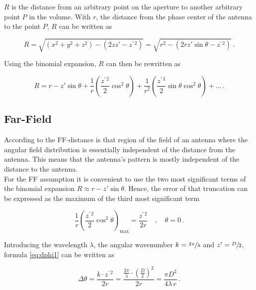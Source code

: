 $R$ is the distance from an arbitrary point on the aperture to another arbitrary point $P$ in the volume. With $r$, the distance from the phase center of the antenna to the point $P$, $R$ can be written as \cite{balanis}

\begin{equation}
R = \sqrt{\left(x^2+y^2+z^2\right)-\left(2zz'-z^{\prime\, 2}\right)}=\sqrt{r^2-\left(2rz'\sin \theta -z^{\prime\, 2}\right)}\,.
\end{equation}

Using the binomial expansion, $R$ can then be rewritten as

\begin{equation}
R = r - z'\sin\theta + \frac{1}{r}\left(\frac{z^{\prime\, 2}}{2}\cos ^2 \theta\right) + \frac{1}{r^2}\left(\frac{z^{\prime\, 3}}{2}\sin\theta\cos^2\theta\right) + \dots\,.
\end{equation}

\subsection{Far-Field}

According to \cite{balanis} the \ac{FF}-distance is \glqq that region of the field of an antenna where the angular field distribution is essentially independent of the distance from the antenna.\grqq{ }
This means that the antenna's pattern is mostly independent of the distance to the antenna.\\
For the \ac{FF} assumption it is convenient to use the two most significant terms of the binomial expansion $R\approx r - z'\sin\theta$. Hence, the error of that truncation can be expressed as the maximum of the third most significant term

\begin{equation}
\frac{1}{r}\left(\frac{z^{\prime\, 2}}{2}\cos ^2 \theta\right)_\text{max} = \frac{z^{\prime\, 2}}{2r} \quad , \quad \theta = 0\,.
\label{eq:dphi1}
\end{equation}

Introducing the wavelength $\lambda$, the angular wavenumber $k=\sfrac{2\pi}{\lambda}$ and $z'=\sfrac{D}{2}$, formula \ref{eq:dphi1} can be written as


\begin{equation}
\Delta\theta = \frac{k\cdot z^{\prime\, 2}}{2r} =\frac{\frac{2\pi}{\lambda}\cdot \left(\frac{D}{2}\right)^2}{2r} = \frac{\pi D^2}{4\lambda\, r}\,.
\end{equation}


